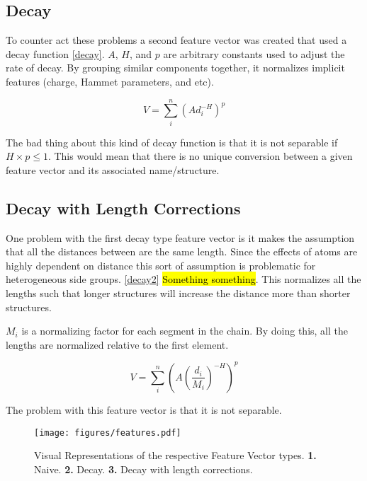 \documentclass[10pt]{article}
\begin{document}
\subsection{Decay}
To counter act these problems a second feature vector was created that used a decay function \eqref{decay}. $A$, $H$, and $p$ are arbitrary constants used to adjust the rate of decay. By grouping similar components together, it normalizes implicit features (charge, Hammet parameters, and etc).

\begin{equation}\label{decay}
    V = \sum_i^n (A d_i^{-H})^{p}
\end{equation}

The bad thing about this kind of decay function is that it is not separable if $H \times p \le 1$. This would mean that there is no unique conversion between a given feature vector and its associated name/structure.


\subsection{Decay with Length Corrections}

One problem with the first decay type feature vector is it makes the assumption that all the distances between are the same length. Since the effects of atoms are highly dependent on distance this sort of assumption is problematic for heterogeneous side groups. \eqref{decay2} \hl{Something something}. This normalizes all the lengths such that longer structures will increase the distance more than shorter structures.

$M_i$ is a normalizing factor for each segment in the chain. By doing this, all the lengths are normalized relative to the first element.

\begin{equation}\label{decay2}
    V = \sum_i^n \left(A \left(\frac{d_i}{M_i}\right)^{-H} \right)^{p}
\end{equation}

The problem with this feature vector is that it is not separable.

\begin{figure}[H]
  \begin{center}
    \texttt{[image: figures/features.pdf]}
  \end{center}
  \caption{Visual Representations of the respective Feature Vector types. \textbf{1.} Naive. \textbf{2.} Decay. \textbf{3.} Decay with length corrections.}
  \label{fig:features}
\end{figure}
\end{document}
